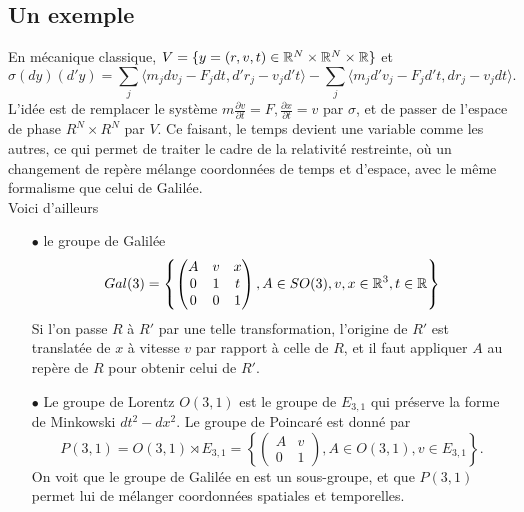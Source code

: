\subsection{Un exemple}

En mécanique classique, $V=\{y=(r,v,t)\in \mathbb R^N\times \mathbb R^N\times \mathbb R\}$ et \[\sigma(dy)(d'y)=\sum_j \langle m_jdv_j - F_jdt , d'r_j-v_j d't\rangle-\sum_j \langle m_j d'v_j -F_j d't, dr_j-v_j dt \rangle.\]
L'idée est de remplacer le système $m\frac{\partial v}{\partial t} = F,\frac{\partial x}{\partial t} =v$ par $\sigma$, et de passer de l'espace de phase $R^N\times R^N$ par $V$. Ce faisant, le temps devient une variable comme les autres, ce qui permet de traiter le cadre de la relativité restreinte, où un changement de repère mélange coordonnées de temps et d'espace, avec le même formalisme que celui de Galilée.\\

Voici d'ailleurs
\begin{itemize}
\item[$\bullet$] le groupe de Galilée 
\[Gal(3)=\left\{\begin{pmatrix} A & v & x \\ 0 & 1 & t \\ 0 & 0 & 1 \end{pmatrix}, A\in SO(3), v,x\in \mathbb R^3,t\in \mathbb R\right\}\]
Si l'on passe $R$ à $R'$ par une telle transformation, l'origine de $R'$ est translatée de $x$ à vitesse $v$ par rapport à celle de $R$, et il faut appliquer $A$ au repère de $R$ pour obtenir celui de $R'$.
\item[$\bullet$] Le groupe de Lorentz $O(3,1)$ est le groupe de $E_{3,1}$ qui préserve la forme de Minkowski $dt^2-dx^2$. Le groupe de Poincaré est donné par
\[P(3,1)=O(3,1)\rtimes E_{3,1} =\left\{\begin{pmatrix} A & v \\ 0 & 1 \end{pmatrix}, A\in O(3,1),v\in E_{3,1}\right\}.\]
On voit que le groupe de Galilée en est un sous-groupe, et que $P(3,1)$ permet lui de mélanger coordonnées spatiales et temporelles. \\
\end{itemize}

